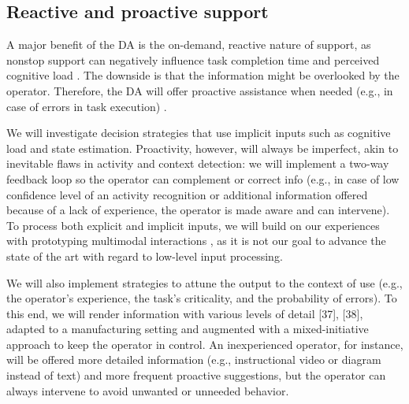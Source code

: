 \subsection{Reactive and proactive support} \label{sec:ReactiveProactive}

A major benefit of the DA is the on-demand, reactive nature of support, as nonstop support can negatively influence task completion time and perceived cognitive load \cite{funk2017WorkingAugmentedReality}. The downside is that the information might be overlooked by the operator. Therefore, the DA will offer proactive assistance when needed (e.g., in case of errors in task execution) \cite{cuenca2016HasseltRapidPrototyping}. 

We will investigate decision strategies that use implicit inputs such as cognitive load \cite{lindlbauer2019ContextAwareOnlineAdaptation} and state estimation. Proactivity, however, will always be imperfect, akin to inevitable flaws in activity and context detection: we will implement a two-way feedback loop so the operator can complement or correct info (e.g., in case of low confidence level of an activity recognition or additional information offered because of a lack of experience, the operator is made aware and can intervene). 
To process both explicit and implicit inputs, we will build on our experiences with prototyping multimodal interactions \cite{eshet2016ContextUseFinal}, as it is not our goal to advance the state of the art with regard to low-level input processing. 

We will also implement strategies to attune the output to the context of use (e.g., the operator's experience, the task's criticality, and the probability of errors). To this end, we will render information with various levels of detail [37], [38], adapted to a manufacturing setting and augmented with a mixed-initiative approach to keep the operator in control. An inexperienced operator, for instance, will be offered more detailed information (e.g., instructional video or diagram instead of text) and more frequent proactive suggestions, but the operator can always intervene to avoid unwanted or unneeded behavior.




